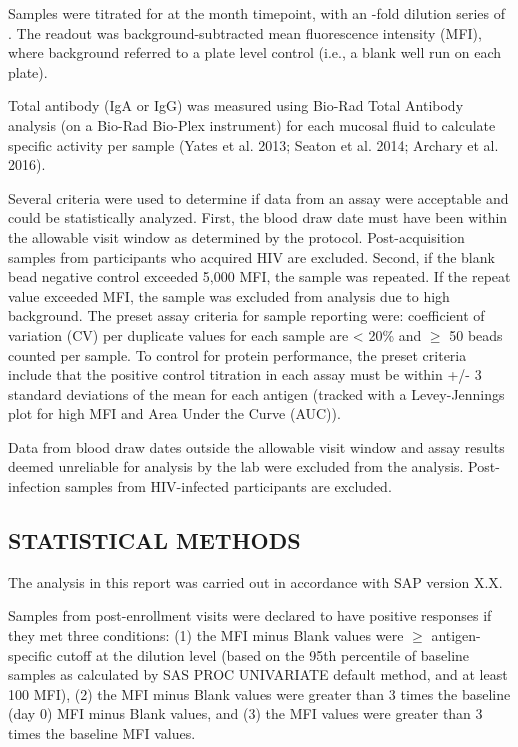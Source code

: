 \documentclass[12pt]{article}
\begin{document}
Samples were titrated for at the month timepoint, with an -fold dilution
series of . The readout was background-subtracted mean fluorescence
intensity (MFI), where background referred to a plate level control
(i.e., a blank well run on each plate).

Total antibody (IgA or IgG) was measured using Bio-Rad Total Antibody
analysis (on a Bio-Rad Bio-Plex instrument) for each mucosal fluid to
calculate specific activity per sample (Yates et al. 2013; Seaton et al.
2014; Archary et al. 2016).

Several criteria were used to determine if data from an assay were
acceptable and could be statistically analyzed. First, the blood draw
date must have been within the allowable visit window as determined by
the protocol. Post-acquisition samples from participants who acquired
HIV are excluded. Second, if the blank bead negative control exceeded
5,000 MFI, the sample was repeated. If the repeat value exceeded MFI,
the sample was excluded from analysis due to high background. The preset
assay criteria for sample reporting were: coefficient of variation (CV)
per duplicate values for each sample are \textless{} 20\% and \(\geq\)
50 beads counted per sample. To control for protein performance, the
preset criteria include that the positive control titration in each
assay must be within +/- 3 standard deviations of the mean for each
antigen (tracked with a Levey-Jennings plot for high MFI and Area Under
the Curve (AUC)).

Data from blood draw dates outside the allowable visit window and assay
results deemed unreliable for analysis by the lab were excluded from the
analysis. Post-infection samples from HIV-infected participants are
excluded.

\hypertarget{statistical-methods}{%
\subsection{STATISTICAL METHODS}\label{statistical-methods}}

The analysis in this report was carried out in accordance with SAP
version X.X.

Samples from post-enrollment visits were declared to have positive
responses if they met three conditions: (1) the MFI minus Blank values
were \(\geq\) antigen-specific cutoff at the dilution level (based on
the 95th percentile of baseline samples as calculated by SAS PROC
UNIVARIATE default method, and at least 100 MFI), (2) the MFI minus
Blank values were greater than 3 times the baseline (day 0) MFI minus
Blank values, and (3) the MFI values were greater than 3 times the
baseline MFI values.
\end{document}

